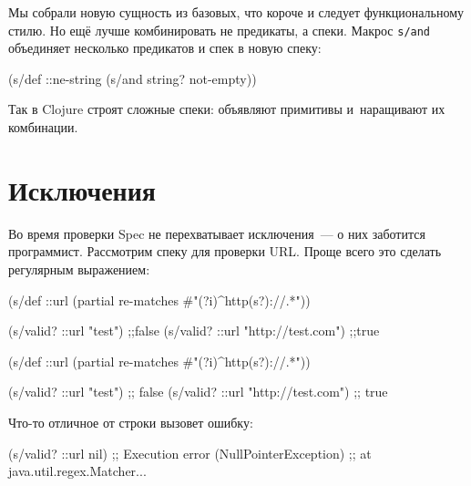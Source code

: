 Мы собрали новую сущность из базовых, что короче и следует функциональному
стилю. Но ещё лучше комбинировать не предикаты, а спеки. Макрос \verb|s/and|
объединяет несколько предикатов и спек в новую спеку:

\begin{english}
  \begin{clojure}
(s/def ::ne-string
  (s/and string? not-empty))
  \end{clojure}
\end{english}

Так в Clojure строят сложные спеки: объявляют примитивы и~наращивают их
комбинации.

\section{Исключения}


Во время проверки Spec не перехватывает исключения~--- о них заботится
программист. Рассмотрим спеку для проверки URL. Проще всего это сделать
регулярным выражением:


\ifx\DEVICETYPE\MOBILE

\begin{english}
  \begin{clojure}
(s/def ::url
  (partial
    re-matches #"(?i)^http(s?)://.*"))

(s/valid? ::url "test") ;;false
(s/valid? ::url "http://test.com") ;;true
  \end{clojure}
\end{english}

\else

\begin{english}
  \begin{clojure}
(s/def ::url
  (partial re-matches #"(?i)^http(s?)://.*"))

(s/valid? ::url "test")            ;; false
(s/valid? ::url "http://test.com") ;; true
  \end{clojure}
\end{english}

\fi

Что-то отличное от строки вызовет ошибку:


\begin{english}
  \begin{clojure}
(s/valid? ::url nil)
;; Execution error (NullPointerException)
;; at java.util.regex.Matcher...
  \end{clojure}
\end{english}

